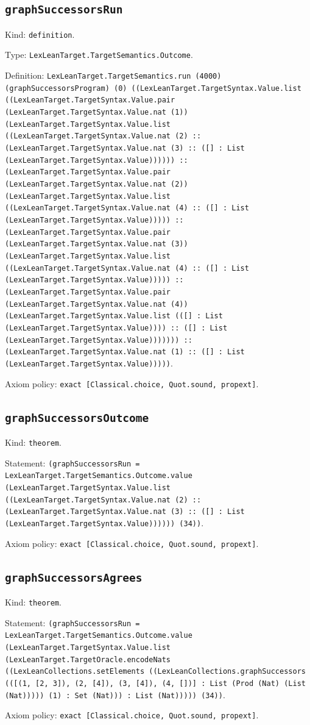 \documentclass[11pt]{article}
\begin{document}
\subsection*{\texttt{graphSuccessorsRun}}
\noindent Kind: \texttt{definition}.\par
\noindent Type: \texttt{LexLeanTarget.TargetSemantics.Outcome}.\par
\noindent Definition: \texttt{LexLeanTarget.TargetSemantics.run (4000) (graphSuccessorsProgram) (0) ((LexLeanTarget.TargetSyntax.Value.list ((LexLeanTarget.TargetSyntax.Value.pair (LexLeanTarget.TargetSyntax.Value.nat (1)) (LexLeanTarget.TargetSyntax.Value.list ((LexLeanTarget.TargetSyntax.Value.nat (2) :: (LexLeanTarget.TargetSyntax.Value.nat (3) :: ([] : List (LexLeanTarget.TargetSyntax.Value)))))) :: (LexLeanTarget.TargetSyntax.Value.pair (LexLeanTarget.TargetSyntax.Value.nat (2)) (LexLeanTarget.TargetSyntax.Value.list ((LexLeanTarget.TargetSyntax.Value.nat (4) :: ([] : List (LexLeanTarget.TargetSyntax.Value))))) :: (LexLeanTarget.TargetSyntax.Value.pair (LexLeanTarget.TargetSyntax.Value.nat (3)) (LexLeanTarget.TargetSyntax.Value.list ((LexLeanTarget.TargetSyntax.Value.nat (4) :: ([] : List (LexLeanTarget.TargetSyntax.Value))))) :: (LexLeanTarget.TargetSyntax.Value.pair (LexLeanTarget.TargetSyntax.Value.nat (4)) (LexLeanTarget.TargetSyntax.Value.list (([] : List (LexLeanTarget.TargetSyntax.Value)))) :: ([] : List (LexLeanTarget.TargetSyntax.Value))))))) :: (LexLeanTarget.TargetSyntax.Value.nat (1) :: ([] : List (LexLeanTarget.TargetSyntax.Value)))))}.\par
\noindent Axiom policy: \texttt{exact [Classical.choice, Quot.sound, propext]}.\par
\subsection*{\texttt{graphSuccessorsOutcome}}
\noindent Kind: \texttt{theorem}.\par
\noindent Statement: \texttt{(graphSuccessorsRun = LexLeanTarget.TargetSemantics.Outcome.value (LexLeanTarget.TargetSyntax.Value.list ((LexLeanTarget.TargetSyntax.Value.nat (2) :: (LexLeanTarget.TargetSyntax.Value.nat (3) :: ([] : List (LexLeanTarget.TargetSyntax.Value)))))) (34))}.\par
\noindent Axiom policy: \texttt{exact [Classical.choice, Quot.sound, propext]}.\par
\subsection*{\texttt{graphSuccessorsAgrees}}
\noindent Kind: \texttt{theorem}.\par
\noindent Statement: \texttt{(graphSuccessorsRun = LexLeanTarget.TargetSemantics.Outcome.value (LexLeanTarget.TargetSyntax.Value.list (LexLeanTarget.TargetOracle.encodeNats ((LexLeanCollections.setElements ((LexLeanCollections.graphSuccessors (([(1, [2, 3]), (2, [4]), (3, [4]), (4, [])] : List (Prod (Nat) (List (Nat))))) (1) : Set (Nat))) : List (Nat))))) (34))}.\par
\noindent Axiom policy: \texttt{exact [Classical.choice, Quot.sound, propext]}.\par
\end{document}
